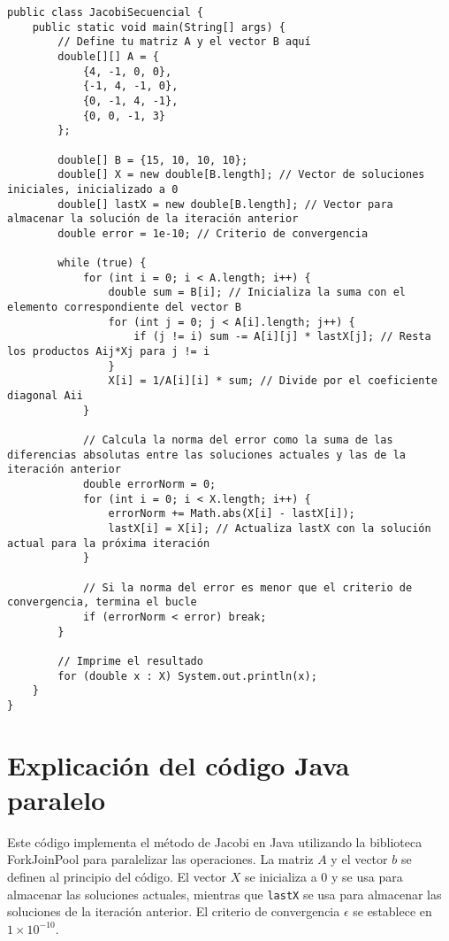 \documentclass[]{article}
\begin{document}
\begin{verbatim}
public class JacobiSecuencial {
    public static void main(String[] args) {
        // Define tu matriz A y el vector B aquí
        double[][] A = {
            {4, -1, 0, 0},
            {-1, 4, -1, 0},
            {0, -1, 4, -1},
            {0, 0, -1, 3}
        };
        
        double[] B = {15, 10, 10, 10};
        double[] X = new double[B.length]; // Vector de soluciones iniciales, inicializado a 0
        double[] lastX = new double[B.length]; // Vector para almacenar la solución de la iteración anterior
        double error = 1e-10; // Criterio de convergencia

        while (true) {
            for (int i = 0; i < A.length; i++) {
                double sum = B[i]; // Inicializa la suma con el elemento correspondiente del vector B
                for (int j = 0; j < A[i].length; j++) {
                    if (j != i) sum -= A[i][j] * lastX[j]; // Resta los productos Aij*Xj para j != i
                }
                X[i] = 1/A[i][i] * sum; // Divide por el coeficiente diagonal Aii
            }

            // Calcula la norma del error como la suma de las diferencias absolutas entre las soluciones actuales y las de la iteración anterior
            double errorNorm = 0;
            for (int i = 0; i < X.length; i++) {
                errorNorm += Math.abs(X[i] - lastX[i]);
                lastX[i] = X[i]; // Actualiza lastX con la solución actual para la próxima iteración
            }

            // Si la norma del error es menor que el criterio de convergencia, termina el bucle
            if (errorNorm < error) break;
        }

        // Imprime el resultado
        for (double x : X) System.out.println(x);
    }
}
\end{verbatim}

\section{Explicación del código Java paralelo}

Este código implementa el método de Jacobi en Java utilizando la biblioteca ForkJoinPool para paralelizar las operaciones. La matriz $A$ y el vector $b$ se definen al principio del código. El vector $X$ se inicializa a $0$ y se usa para almacenar las soluciones actuales, mientras que \texttt{lastX} se usa para almacenar las soluciones de la iteración anterior. El criterio de convergencia $\epsilon$ se establece en $1 \times 10^{-10}$.
\end{document}
